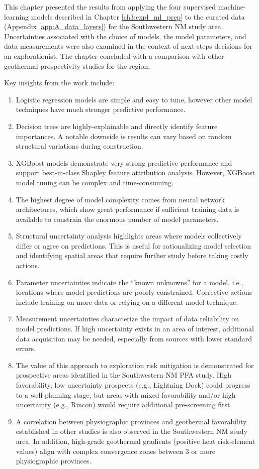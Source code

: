 This chapter presented the results from applying the four supervised machine-learning models described in Chapter \ref{ch3:expl_ml_prep} to the curated data (Appendix \ref{app:A_data_layers}) for the Southwestern NM study area. Uncertainties associated with the choice of models, the model parameters, and data measurements were also examined in the context of next-steps decisions for an explorationist. The chapter concluded with a comparison with other geothermal prospectivity studies for the region.

\noindent
Key insights from the work include:
\begin{enumerate}
    \item Logistic regression models are simple and easy to tune, however other model techniques have much stronger predictive performance.
    \item Decision trees are highly-explainable and directly identify feature importances. A notable downside is results can vary based on random structural variations during construction.
    \item XGBoost models demonstrate very strong predictive performance and support best-in-class Shapley feature attribution analysis. However, XGBoost model tuning can be complex and time-consuming.
    \item The highest degree of model complexity comes from neural network architectures, which show great performance if sufficient training data is available to constrain the enormous number of model parameters.
    \item Structural uncertainty analysis highlights areas where models collectively differ or agree on predictions. This is useful for rationalizing model selection and identifying spatial areas that require further study before taking costly actions.
    \item Parameter uncertainties indicate the ``known unknowns'' for a model, i.e., locations where model predictions are poorly constrained. Corrective actions include training on more data or relying on a different model technique.
    \item Measurement uncertainties characterize the impact of data reliability on model predictions. If high uncertainty exists in an area of interest, additional data acquisition may be needed, especially from sources with lower standard errors. 
    \item The value of this approach to exploration risk mitigation is demonstrated for  prospective areas identified in the Southwestern NM PFA study. High favorability, low uncertainty prospects (e.g., Lightning Dock) could progress to a well-planning stage, but areas with mixed favorability and/or high uncertainty (e.g., Rincon) would require additional pre-screening first.
    \item A correlation between physiographic provinces and geothermal favorability established in other studies is also observed in the Southwestern NM study area. In addition, high-grade geothermal gradients (positive heat risk-element values) align with complex convergence zones between 3 or more physiographic provinces.
\end{enumerate}
